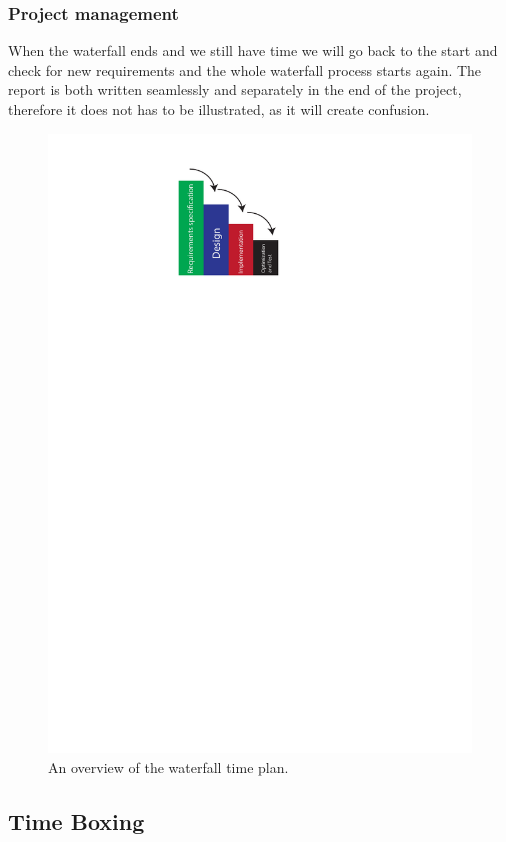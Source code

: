 \subsubsection{Project management}
When the waterfall ends and we still have time
we will go back to the start and check for new requirements
and the whole waterfall process starts again.
The report is both written seamlessly and separately in the end of the project,
therefore it does not has to be illustrated, as it will create confusion.

\begin{figure}[h]
  \centering
  \includegraphics[scale=0.6]{Figures/Waterfall}
  \caption{An overview of the waterfall time plan.}
\label{fig:Waterfall}
\end{figure}
\subsection{Time Boxing} %



